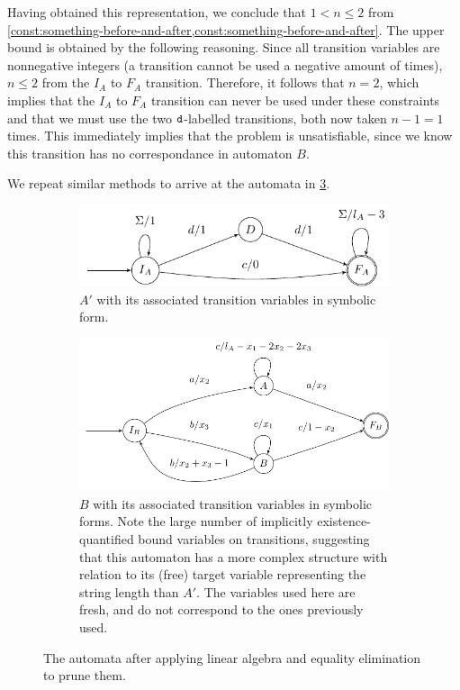 Having obtained this representation, we conclude that $1 < n \leq 2$ from
\cref{const:something-before-and-after,const:something-before-and-after}. The
upper bound is obtained by the following reasoning. Since all transition
variables are nonnegative integers (a transition cannot be used a negative
amount of times), $n \leq 2$ from the $I_A$ to $F_A$ transition. Therefore, it
follows that $n=2$, which implies that the $I_A$ to $F_A$ transition can never
be used under these constraints and that we must use the two $\texttt{d}$-labelled
transitions, both now taken $n-1 =1$ times. This immediately implies that the problem is
unsatisfiable, since we know this transition has no correspondance in automaton
$B$.

We repeat similar methods to arrive at the automata in \cref{fig:propagated}.

\begin{figure}[ht]
    \centering 
  \begin{subfigure}[b]{\autscale\textwidth}
    \centering
    \includegraphics[width=\textwidth]{a_annotated}
    \caption{ $A'$ with its associated transition variables in symbolic
    form.}\label{fig:aut_a_annotated}
  \end{subfigure}\hfill%
  \begin{subfigure}[b]{\autscale\textwidth}
    \centering
    \includegraphics[width=\textwidth]{b_annotated}
    \caption{$B$ with its associated transition variables in symbolic forms.
    Note the large number of implicitly existence-quantified bound variables on
    transitions, suggesting that this automaton has a more complex structure
    with relation to its (free) target variable representing the string length
    than $A'$. The variables used here are fresh, and do not correspond to the
    ones previously used.}\label{fig:aut_b_annotated}
  \end{subfigure}
  \caption{The automata after applying linear algebra and equality elimination
  to prune them.}\label{fig:propagated}
\end{figure}


